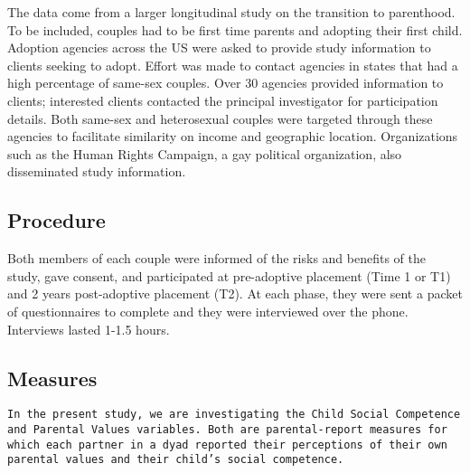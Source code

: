 \documentclass[man]{apa6}
\begin{document}
The data come from a larger longitudinal study on the transition to parenthood. To be included, couples had to be first time parents and adopting their first child. Adoption agencies across the US were asked to provide study information to clients seeking to adopt. Effort was made to contact agencies in states that had a high percentage of same-sex couples. Over 30 agencies provided information to clients; interested clients contacted the principal investigator for participation details. Both same-sex and heterosexual couples were targeted through these agencies to facilitate similarity on income and geographic location. Organizations such as the Human Rights Campaign, a gay political organization, also disseminated study information.

\hypertarget{procedure}{%
\subsection{Procedure}\label{procedure}}

Both members of each couple were informed of the risks and benefits of the study, gave consent, and participated at pre-adoptive placement (Time 1 or T1) and 2 years post-adoptive placement (T2). At each phase, they were sent a packet of questionnaires to complete and they were interviewed over the phone. Interviews lasted 1-1.5 hours.

\hypertarget{measures}{%
\subsection{Measures}\label{measures}}

\begin{verbatim}
In the present study, we are investigating the Child Social Competence and Parental Values variables. Both are parental-report measures for which each partner in a dyad reported their perceptions of their own parental values and their child’s social competence. 
\end{verbatim}
\end{document}
